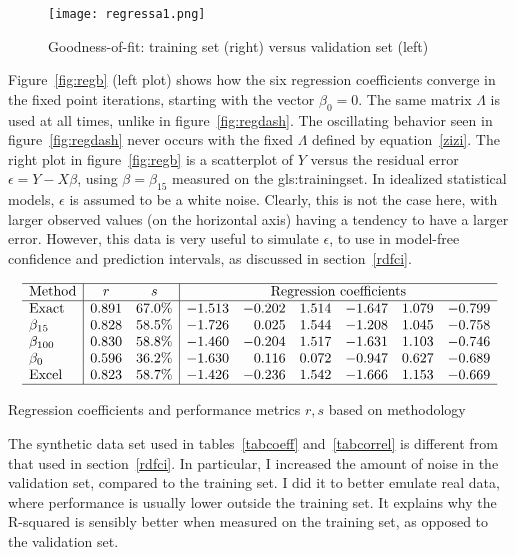 \documentclass[oneside,10pt]{book}
\begin{document}
\begin{figure}%
\centering
\texttt{[image: regressa1.png]} %
\caption{Goodness-of-fit: training set (right) versus validation set (left)}
\label{fig:rega}
\end{figure}

Figure~\ref{fig:regb} (left plot) shows how the six regression coefficients converge in the fixed point iterations, starting with the vector $\beta_0=0$. The same matrix $\Lambda$ is used at all times, unlike in figure~\ref{fig:regdash}. The oscillating behavior seen in figure~\ref{fig:regdash} never occurs with the fixed $\Lambda$
defined by equation~\ref{zizi}. The right plot in figure~\ref{fig:regb} is a scatterplot of $Y$ versus the residual error $\epsilon=Y-X\beta$, using $\beta=\beta_{15}$ measured on the \gls{gls:trainingset}. In idealized statistical models, $\epsilon$ is assumed to be a white noise. Clearly, this is not the case here, with larger observed values (on the horizontal axis) having a tendency to have a larger error. However, this data is very useful to simulate $\epsilon$, to use in
model-free confidence and prediction intervals, as
discussed in section~\ref{rdfci}.



\begin{table}%
\small
\[
\begin{array}{l|cc|rrrrrr}
\hline
\text{Method}  &  r & s &  \multicolumn{6}{c}{\text{Regression coefficients}}\\
\hline
\text{Exact}	&	0.891	&	67.0\%	&	-1.513	&	-0.202	&	1.514	&	-1.647	&	1.079	 &	-0.799	\\
\beta_{15}	&	0.828	&	58.5\%	&	-1.726	&	0.025	&	1.544	&	-1.208	&	1.045	&	-0.758	\\
\beta_{100}	&	0.830	&	58.8\%	&	-1.460	&	-0.204	&	1.517	&	-1.631	&	1.103	&	-0.746	\\
\beta_0	&	0.596	&	36.2\%	&	-1.630	&	0.116	&	0.072	&	-0.947	&	0.627	&	-0.689	\\
\text{Excel}	&	0.823	&	58.7\%	&	-1.426	&	-0.236	&	1.542	&	-1.666	&	1.153	&	-0.669	\\
\hline
\end{array}
\]
\caption{\label{tabcoeff}Regression coefficients and performance metrics $r, s$ based on methodology}
\end{table}

The synthetic data set used in tables~\ref{tabcoeff} and~\ref{tabcorrel} is different from that used in section~\ref{rdfci}.  In particular, I increased the amount of noise in the validation set, compared to the training set. I did it to better emulate real data, where performance is usually lower outside the training set. It explains why the R-squared is sensibly better when measured on the training set, as opposed to the validation set.
\end{document}
